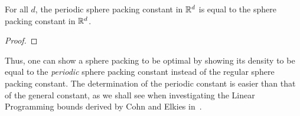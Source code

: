 \begin{theorem}\label{periodic-packing-optimal}\notready
    For all $d$, the periodic sphere packing constant in $\mathbb{R}^d$ is equal to the sphere packing constant in $\mathbb{R}^d$.
\end{theorem}
\begin{proof}
\end{proof}

Thus, one can show a sphere packing to be optimal by showing its density to be equal to the \emph{periodic} sphere packing constant instead of the regular sphere packing constant. The determination of the periodic constant is easier than that of the general constant, as we shall see when investigating the Linear Programming bounds derived by Cohn and Elkies in~\cite{ElkiesCohn}.
